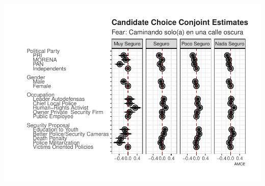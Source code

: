 \documentclass[12pt,]{article}
\begin{document}
\includegraphics{report_conjoint_candidate_pdf_files/figure-latex/unnamed-chunk-7-1.pdf}
\end{document}
